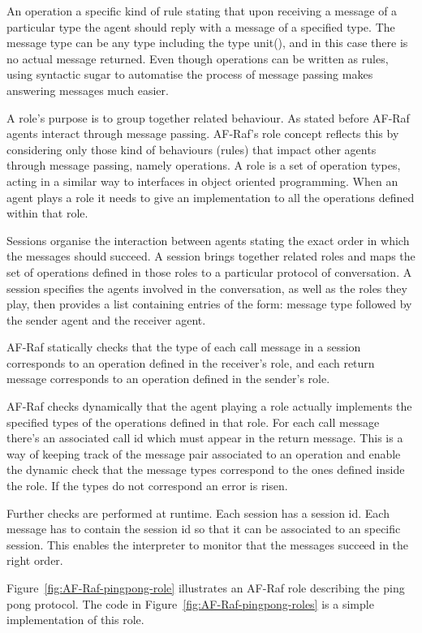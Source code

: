 \documentclass[a4paper,12pt,oneside,fleqn]{book} %
\theoremstyle{plain}
\theoremstyle{definition}
\theoremstyle{remark}
\begin{document}
An operation a specific kind of rule stating that upon receiving a message
of a particular type the agent should reply with a message of a specified
type. The message type can be any type including the type unit(), and in
this case there is no actual message returned. Even though operations can
be written as rules, using syntactic sugar to automatise the process of
message passing makes answering messages much easier.

A role's purpose is to group together related behaviour. As stated before
AF-Raf agents interact through message passing. AF-Raf's role concept
reflects this by considering only those kind of behaviours (rules) that
impact other agents through message passing, namely operations. A role is a
set of operation types, acting in a similar way to interfaces in object
oriented programming. When an agent plays a role it needs to give an
implementation to all the operations defined within that role.

Sessions organise the interaction between agents stating the exact order in
which the messages should succeed. A session brings together related roles
and maps the set of operations defined in those roles to a particular
protocol of conversation. A session specifies the agents involved in the
conversation, as well as the roles they play, then provides a list
containing entries of the form: message type followed by the sender agent
and the receiver agent.

AF-Raf statically checks that the type of each call message in a session
corresponds to an operation defined in the receiver's role, and each return
message corresponds to an operation defined in the sender's role.

AF-Raf checks dynamically that the agent playing a role actually implements
the specified types of the operations defined in that role.  For each call
message there's an associated call id which must appear in the return
message. This is a way of keeping track of the message pair associated to
an operation and enable the dynamic check that the message types correspond
to the ones defined inside the role. If the types do not correspond an
error is risen.

Further checks are performed at runtime. Each session has a session id.
Each message has to contain the session id so that it can be associated to
an specific session. This enables the interpreter to monitor that the
messages succeed in the right order.



Figure~\ref{fig:AF-Raf-pingpong-role} illustrates an AF-Raf role describing
the ping pong protocol. The code in Figure~\ref{fig:AF-Raf-pingpong-roles}
is a simple implementation of this role.
\end{document}
